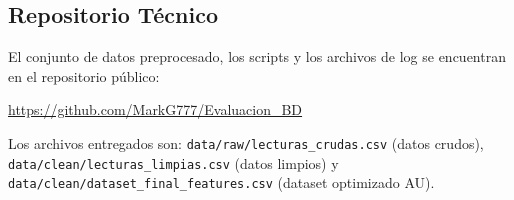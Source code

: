 \subsection{Repositorio T\'ecnico}

El conjunto de datos preprocesado, los scripts y los archivos de log se encuentran
en el repositorio p\'ublico:

\begin{center}
  \url{https://github.com/MarkG777/Evaluacion_BD}
\end{center}

Los archivos entregados son:
\texttt{data/raw/lecturas\_crudas.csv} (datos crudos),
\texttt{data/clean/lecturas\_limpias.csv} (datos limpios) y
\texttt{data/clean/dataset\_final\_features.csv} (dataset optimizado AU).
